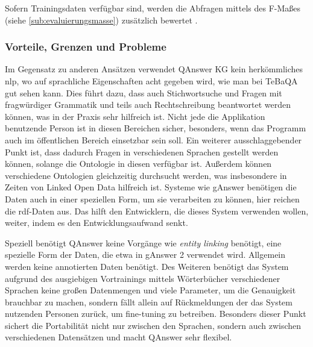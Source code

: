 Sofern Trainingsdaten verfügbar sind, werden die Abfragen mittels des F-Maßes (siehe \cref{sub:evaluierungsmasse}) zusätzlich bewertet \citep{qanswerpatentapplication}.

\subsubsection{Vorteile, Grenzen und Probleme}

Im Gegensatz zu anderen Ansätzen verwendet QAnswer KG kein herkömmliches \ac{nlp}, wo auf sprachliche Eigenschaften acht gegeben wird, wie man bei TeBaQA gut sehen kann.
Dies führt dazu, dass auch Stichwortsuche und Fragen mit fragwürdiger Grammatik und teils auch Rechtschreibung beantwortet werden können, was in der Praxis sehr hilfreich ist.
Nicht jede die Applikation benutzende Person ist in diesen Bereichen sicher, besonders, wenn das Programm auch im öffentlichen Bereich einsetzbar sein soll.
Ein weiterer ausschlaggebender Punkt ist, dass dadurch Fragen in verschiedenen Sprachen gestellt werden können, solange die Ontologie in diesen verfügbar ist.
Außerdem können verschiedene Ontologien gleichzeitig durchsucht werden, was insbesondere in Zeiten von Linked Open Data hilfreich ist.
Systeme wie gAnswer benötigen die Daten auch in einer speziellen Form, um sie verarbeiten zu können, hier reichen die \ac{rdf}-Daten aus.
Das hilft den Entwicklern, die dieses System verwenden wollen, weiter, indem es den Entwicklungsaufwand senkt.

Speziell benötigt QAnswer keine Vorgänge wie \emph{entity linking} benötigt, eine spezielle Form der Daten, die etwa in gAnswer 2 verwendet wird.
Allgemein werden keine annotierten Daten benötigt.
Des Weiteren benötigt das System aufgrund des ausgiebigen Vortrainings mittels Wörterbücher verschiedener Sprachen keine großen Datenmengen und viele Parameter,
um die Genauigkeit brauchbar zu machen, sondern fällt allein auf Rückmeldungen der das System nutzenden Personen zurück, um fine-tuning zu betreiben.
Besonders dieser Punkt sichert die Portabilität nicht nur zwischen den Sprachen, sondern auch zwischen verschiedenen Datensätzen und macht QAnswer sehr flexibel.

